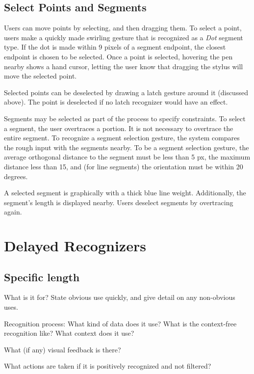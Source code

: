 

\subsection{Select Points and Segments}

Users can move points by selecting, and then dragging them. To select
a point, users make a quickly made swirling gesture that is recognized
as a \textit{Dot} segment type. If the dot is made within 9 pixels of
a segment endpoint, the closest endpoint is chosen to be
selected. Once a point is selected, hovering the pen nearby shows a
hand cursor, letting the user know that dragging the stylus will move
the selected point.

Selected points can be deselected by drawing a latch gesture around it
(discussed above). The point is deselected if no latch recognizer
would have an effect.

Segments may be selected as part of the process to specify  constraints. To select a segment, the user overtraces a
portion. It is not necessary to overtrace the entire segment. To
recognize a segment selection gesture, the system compares the rough
input with the segments nearby. To be a segment selection gesture, the
average orthogonal distance to the segment must be less than 5 px, the
maximum distance less than 15, and (for line segments) the orientation
must be within 20 degrees.

A selected segment is graphically with a thick blue line
weight. Additionally, the segment's length is displayed nearby. Users
deselect segments by overtracing again.

\section{Delayed Recognizers}

\subsection{Specific length}

What is it for? State obvious use quickly, and give detail on any
non-obvious uses.

Recognition process: What kind of data does it use? What is the
context-free recognition like? What context does it use?

What (if any) visual feedback is there?

What actions are taken if it is positively recognized and not
filtered?

